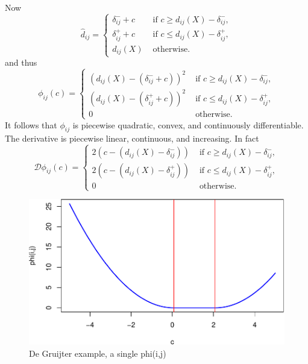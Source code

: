 \documentclass[
  12pt,
]{article}
\begin{document}
Now
\begin{equation}
\hat d_{ij}=\begin{cases}
\delta_{ij}^-+c&\text{ if }c\geq d_{ij}(X)-\delta_{ij}^-,\\
\delta_{ij}^++c&\text{ if }c\leq d_{ij}(X)-\delta_{ij}^+,\\
d_{ij}(X)&\text{ otherwise}.
\end{cases}
\label{eq:solves}
\end{equation}
and thus
\begin{equation}
\phi_{ij}(c)=\begin{cases}
(d_{ij}(X)-(\delta_{ij}^-+c))^2&\text{ if }c\geq d_{ij}(X)-\delta_{ij}^-,\\
(d_{ij}(X)-(\delta_{ij}^++c))^2&\text{ if }c\leq d_{ij}(X)-\delta_{ij}^+,\\
0&\text{ otherwise}.
\end{cases}
\label{eq:funcs}
\end{equation}
It follows that \(\phi_{ij}\) is
piecewise quadratic, convex, and continuously differentiable. The derivative
is piecewise linear, continuous, and increasing. In fact
\begin{equation}
\mathcal{D}\phi_{ij}(c)=\begin{cases}
2(c-(d_{ij}(X)-\delta_{ij}^-))&\text{ if }c\geq d_{ij}(X)-\delta_{ij}^-,\\
2(c-(d_{ij}(X)-\delta_{ij}^+))&\text{ if }c\leq d_{ij}(X)-\delta_{ij}^+,\\
0&\text{ otherwise}.
\end{cases}
\label{eq:derivs}
\end{equation}

\begin{figure}
\centering
\includegraphics{smacofAC_files/figure-latex/onefunc-1.pdf}
\caption{\label{fig:onefunc}De Gruijter example, a single phi(i,j)}
\end{figure}
\end{document}

